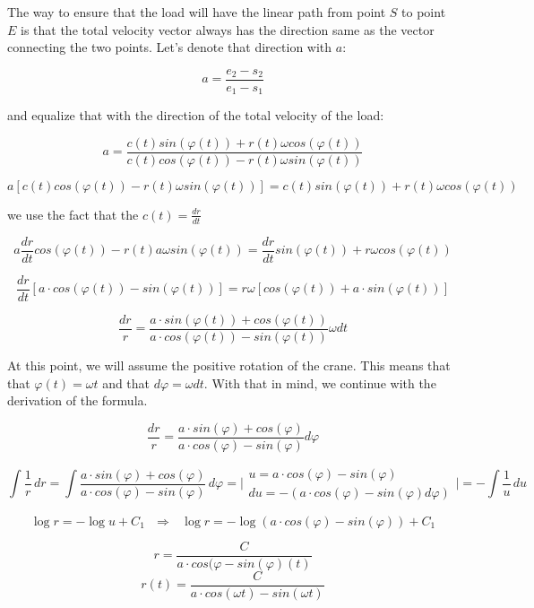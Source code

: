 \documentclass[11pt]{article}
\begin{document}
The way to ensure that the load will have the linear path from point $S$ to point $E$ is that the total velocity vector always has the direction same as the vector connecting the two points. Let's denote that direction with $a$:

\[ a = \frac{e_2 - s_2}{e_1 - s_1} \]

\noindent and equalize that with the direction of the total velocity of the load:

\[ a = \frac{c(t)sin(\varphi(t)) + r(t)\omega cos(\varphi(t))}{c(t)cos(\varphi(t)) - r(t)\omega sin(\varphi(t))} \]

\[ a [c(t)cos(\varphi(t)) - r(t)\omega sin(\varphi(t))] = c(t)sin(\varphi(t)) + r(t)\omega cos(\varphi(t)) \]

\noindent we use the fact that the $c(t) = \frac{dr}{dt}$

\[ a\frac{dr}{dt}cos(\varphi(t)) - r(t)a\omega sin(\varphi(t)) = \frac{dr}{dt}sin(\varphi(t)) + r\omega cos(\varphi(t))\]

\[ \frac{dr}{dt}[a\cdot cos(\varphi(t)) - sin(\varphi(t))] = r\omega[cos(\varphi(t))+a\cdot sin(\varphi(t))] \]

\[ \frac{dr}{r} = \frac{a\cdot sin(\varphi(t))+cos(\varphi(t))}{a\cdot cos(\varphi(t))-sin(\varphi(t))}\omega dt \]

At this point, we will assume the positive rotation of the crane. This means that that $\varphi(t) = \omega t$ and that $d\varphi = \omega dt$. With that in mind, we continue with the derivation of the formula.

\[ \frac{dr}{r} = \frac{a\cdot sin(\varphi)+cos(\varphi)}{a\cdot cos(\varphi)-sin(\varphi)}d\varphi \]


\[ \int \frac{1}{r} \,dr = \int \frac{a\cdot sin(\varphi)+cos(\varphi)}{a\cdot cos(\varphi)-sin(\varphi)} \,d\varphi = \Bigg| \begin{array}{ll}
                  u = a\cdot cos(\varphi) - sin(\varphi)\\
                  du = -(a\cdot cos(\varphi) - sin(\varphi)d\varphi)
                \end{array}
                \Bigg|= - \int \frac{1}{u} \,du
\]

\[ \log{r} = -\log{u} + C_1 \ \ \ \Rightarrow \ \ \ \log{r} = -\log{(a\cdot cos(\varphi) - sin(\varphi))} + C_1\]

\[ r = \frac{C}{a\cdot cos(\varphi - sin(\varphi)(t)}\]
\[ r(t) = \frac{C}{a\cdot cos(\omega t) - sin(\omega t)}\]
\end{document}
